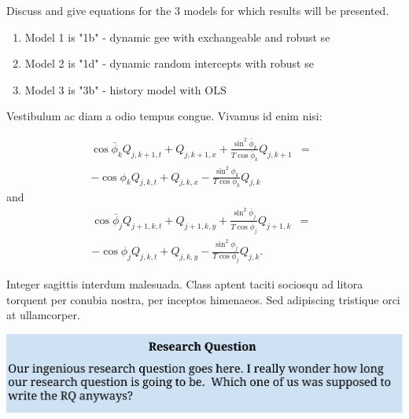 \documentclass[a0,landscape]{a0poster}
\begin{document}
\begin{multicols}{3}
Discuss and give equations for the 3 models for which results will be presented.

\begin{enumerate}
\item Model 1 is "1b" - dynamic gee with exchangeable and robust se
\item Model 2 is "1d" - dynamic random intercepts with robust se
\item Model 3 is "3b" - history model with OLS
\end{enumerate}

Vestibulum ac diam a odio tempus congue. Vivamus id enim nisi:

\begin{eqnarray}
\cos\bar{\phi}_k Q_{j,k+1,t} + Q_{j,k+1,x}+\frac{\sin^2\bar{\phi}_k}{T\cos\bar{\phi}_k} Q_{j,k+1} &=&\nonumber\\ 
-\cos\phi_k Q_{j,k,t} + Q_{j,k,x}-\frac{\sin^2\phi_k}{T\cos\phi_k} Q_{j,k}\label{edgek}
\end{eqnarray}
and
\begin{eqnarray}
\cos\bar{\phi}_j Q_{j+1,k,t} + Q_{j+1,k,y}+\frac{\sin^2\bar{\phi}_j}{T\cos\bar{\phi}_j} Q_{j+1,k}&=&\nonumber \\
-\cos\phi_j Q_{j,k,t} + Q_{j,k,y}-\frac{\sin^2\phi_j}{T\cos\phi_j} Q_{j,k}.\label{edgej}
\end{eqnarray} 

Integer sagittis interdum malesuada. Class aptent taciti sociosqu ad litora torquent per conubia nostra, per inceptos himenaeos. Sed adipiscing tristique orci at ullamcorper.

\begin{center}\vspace{1cm}
\includegraphics[width=1.0\linewidth]{ResearchQuestion.pdf}
\end{center}\vspace{1cm}



\end{multicols}
\end{document}
